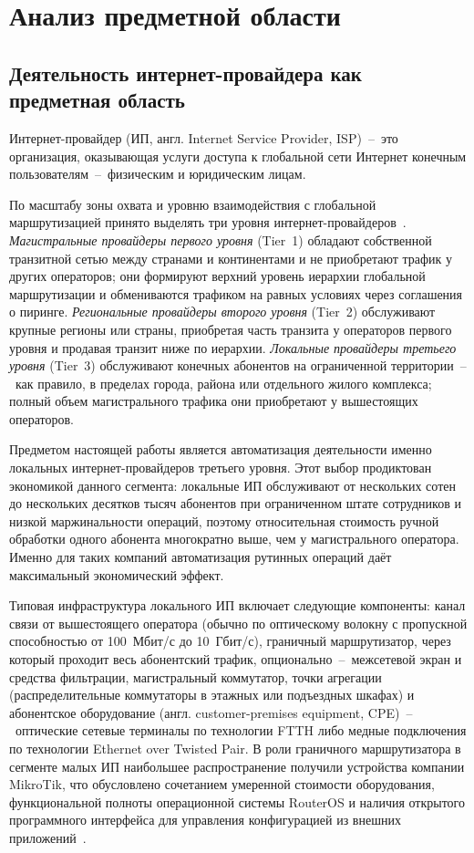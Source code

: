 \section{Анализ предметной области}

\subsection{Деятельность интернет-провайдера как предметная область}

Интернет-провайдер (ИП, англ. Internet Service Provider, ISP)~--~это организация, оказывающая услуги доступа к глобальной сети Интернет конечным пользователям~--~физическим и юридическим лицам.

По масштабу зоны охвата и уровню взаимодействия с глобальной маршрутизацией принято выделять три уровня интернет-провайдеров~\cite{olifer}. \emph{Магистральные провайдеры первого уровня} (Tier~1) обладают собственной транзитной сетью между странами и континентами и не приобретают трафик у других операторов; они формируют верхний уровень иерархии глобальной маршрутизации и обмениваются трафиком на равных условиях через соглашения о пиринге. \emph{Региональные провайдеры второго уровня} (Tier~2) обслуживают крупные регионы или страны, приобретая часть транзита у операторов первого уровня и продавая транзит ниже по иерархии. \emph{Локальные провайдеры третьего уровня} (Tier~3) обслуживают конечных абонентов на ограниченной территории~--~как правило, в пределах города, района или отдельного жилого комплекса; полный объем магистрального трафика они приобретают у вышестоящих операторов.

Предметом настоящей работы является автоматизация деятельности именно локальных интернет-провайдеров третьего уровня. Этот выбор продиктован экономикой данного сегмента: локальные ИП обслуживают от нескольких сотен до нескольких десятков тысяч абонентов при ограниченном штате сотрудников и низкой маржинальности операций, поэтому относительная стоимость ручной обработки одного абонента многократно выше, чем у магистрального оператора. Именно для таких компаний автоматизация рутинных операций даёт максимальный экономический эффект.

Типовая инфраструктура локального ИП включает следующие компоненты: канал связи от вышестоящего оператора (обычно по оптическому волокну с пропускной способностью от 100~Мбит/с до 10~Гбит/с), граничный маршрутизатор, через который проходит весь абонентский трафик, опционально~--~межсетевой экран и средства фильтрации, магистральный коммутатор, точки агрегации (распределительные коммутаторы в этажных или подъездных шкафах) и абонентское оборудование (англ. customer-premises equipment, CPE)~--~оптические сетевые терминалы по технологии FTTH либо медные подключения по технологии Ethernet over Twisted Pair. В роли граничного маршрутизатора в сегменте малых ИП наибольшее распространение получили устройства компании MikroTik, что обусловлено сочетанием умеренной стоимости оборудования, функциональной полноты операционной системы RouterOS и наличия открытого программного интерфейса для управления конфигурацией из внешних приложений~\cite{mikrotikwiki,burton}.

